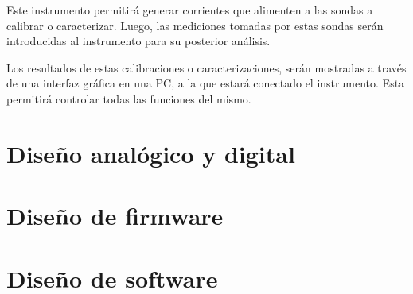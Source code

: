 \documentclass[titlepage, 12pt]{article}
\begin{document}
Este instrumento permitirá generar corrientes que alimenten a las sondas a calibrar o caracterizar. Luego, las mediciones tomadas por estas sondas serán introducidas al instrumento para su posterior análisis.

Los resultados de estas calibraciones o caracterizaciones, serán mostradas a través de una interfaz gráfica en una PC, a la que estará conectado el instrumento. Esta permitirá controlar todas las funciones del mismo.


\section{Diseño analógico y digital}


\section{Diseño de firmware}


\section{Diseño de software}



\newpage
\printbibliography[heading=bibnumbered, title={Bibliografía}]

\newpage
\appendix



\end{document}
